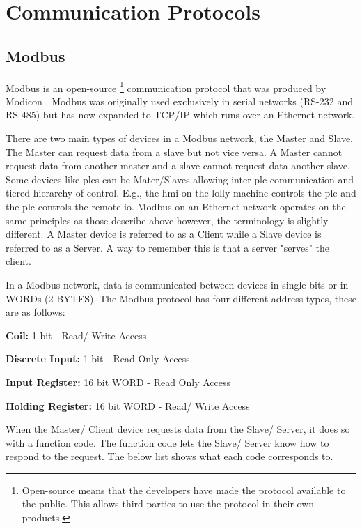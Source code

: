 \section{Communication Protocols}
\subsection{Modbus}
    Modbus is an open-source \footnote{Open-source means that the developers have made the protocol available to the public. This allows third parties to use the protocol in their own products.} communication protocol that was produced by Modicon \cite{frenzel2015handbook}. Modbus was originally used exclusively in serial networks (RS-232 and RS-485) but has now expanded to TCP/IP which runs over an Ethernet network\cite{frenzel2015handbook}. 
    
    There are two main types of devices in a Modbus network, the Master and Slave\cite{frenzel2015handbook}. The Master can request data from a slave but not vice versa. A Master cannot request data from another master and a slave cannot request data another slave. Some devices like \acrshort{plc}s can be Mater/Slaves allowing inter \acrshort{plc} communication and tiered hierarchy of control. E.g., the \acrshort{hmi} on the lolly machine controls the \acrshort{plc} and the \acrshort{plc} controls the remote \acrshort{io}. Modbus on an Ethernet network operates on the same principles as those describe above however, the terminology is slightly different. A Master device is referred to as a Client while a Slave device is referred to as a Server. A way to remember this is that a server "serves" the client.
    
    In a Modbus network, data is communicated between devices in single bits or in WORDs (2 BYTES). 
    The Modbus protocol has four different address types, these are as follows:
    
    \begin{description}
        \item\textbf{Coil:} 1 bit - Read/ Write Access
        \item\textbf{Discrete Input:} 1 bit - Read Only Access
        \item\textbf{Input Register:} 16 bit WORD - Read Only Access
        \item\textbf{Holding Register:} 16 bit WORD - Read/ Write Access
    \end{description}
    
    When the Master/ Client device requests data from the Slave/ Server, it does so with a function code. The function code lets the Slave/ Server know how to respond to the request. The below list shows what each code corresponds to. 
    

